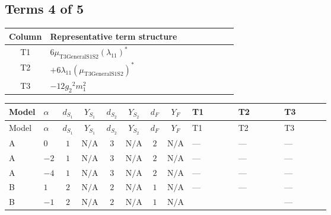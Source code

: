 \documentclass[8pt]{article}
\begin{document}
\begin{landscape}
\subsection*{Terms 4 of 5}
\begin{center}
\begin{tabular}{@{}c >{\raggedright\arraybackslash}p{0.82\linewidth}@{}}
\toprule
Column & Representative term structure \\
\midrule
T1 & \(\displaystyle 6 {\mu_{\mathrm{T3GeneralS1S2}}} \left({\lambda_{11}}\right)^{*}\) \\
\midrule
T2 & \(\displaystyle +6 {\lambda_{11}} \left({\mu_{\mathrm{T3GeneralS1S2}}}\right)^{*}\) \\
\midrule
T3 & \(\displaystyle -12 {g_2}^2 {m_1^2}\) \\
\midrule
\bottomrule
\end{tabular}
\end{center}
\smallskip
\tiny
\begin{longtable}{@{}llcccccc >{\raggedright\arraybackslash}p{0.21\linewidth} >{\raggedright\arraybackslash}p{0.21\linewidth} >{\raggedright\arraybackslash}p{0.21\linewidth}@{}}
\toprule
Model & $\alpha$ & $d_{S_1}$ & $Y_{S_1}$ & $d_{S_2}$ & $Y_{S_2}$ & $d_F$ & $Y_F$ & T1 & T2 & T3 \\
\midrule
\endfirsthead
\toprule
Model & $\alpha$ & $d_{S_1}$ & $Y_{S_1}$ & $d_{S_2}$ & $Y_{S_2}$ & $d_F$ & $Y_F$ & T1 & T2 & T3 \\
\midrule
\endhead
A & $0$ & $1$ & $\text{N/A}$ & $3$ & $\text{N/A}$ & $2$ & $\text{N/A}$ & --- & --- & --- \\
\midrule
A & $-2$ & $1$ & $\text{N/A}$ & $3$ & $\text{N/A}$ & $2$ & $\text{N/A}$ & --- & --- & --- \\
\midrule
A & $-4$ & $1$ & $\text{N/A}$ & $3$ & $\text{N/A}$ & $2$ & $\text{N/A}$ & --- & --- & --- \\
\midrule
B & $1$ & $2$ & $\text{N/A}$ & $2$ & $\text{N/A}$ & $1$ & $\text{N/A}$ & --- & --- & --- \\
\midrule
B & $-1$ & $2$ & $\text{N/A}$ & $2$ & $\text{N/A}$ & $1$ & $\text{N/A}$ & \scriptsize\adjustbox{max width=\linewidth}{$\begin{gathered} 6 {\mu_{\mathrm{T3GeneralS1S2}}} \left({\lambda_{11}}\right)^{*}\end{gathered}$} & \scriptsize\adjustbox{max width=\linewidth}{$\begin{gathered} +6 {\lambda_{11}} \left({\mu_{\mathrm{T3GeneralS1S2}}}\right)^{*}\end{gathered}$} & --- \\

\end{longtable}
\end{landscape}
\end{document}
